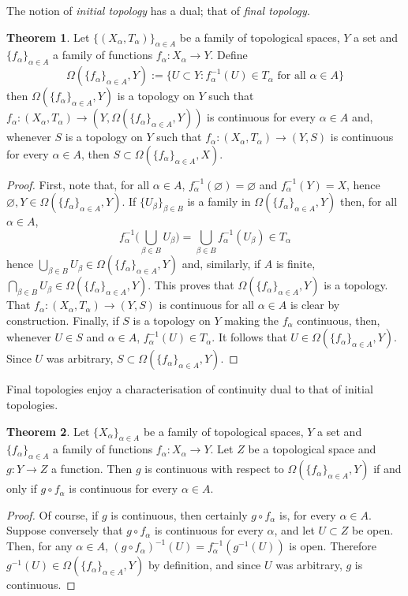 \documentclass{book}
\theoremstyle{definition}
\newtheorem{theorem}{Theorem}[section]
\theoremstyle{remark}
\newcommand{\final}[2]{\Omega(#2, #1)}
\begin{document}
The notion of \textit{initial topology} has a dual; that of \textit{final topology}.

\begin{theorem}
Let $\{(X_\alpha,T_\alpha)\}_{\alpha\in A}$ be a family of topological spaces, $Y$ a set and $\{f_\alpha\}_{\alpha\in A}$ a family of functions $f_\alpha:X_\alpha\to Y$. Define
    $$\final{Y}{\{f_\alpha\}_{\alpha\in A}}:=\{U\subset Y:f_\alpha^{-1}(U)\in T_\alpha\text{ for all }\alpha\in A\}$$
then $\final{Y}{\{f_\alpha\}_{\alpha\in A}}$ is a topology on $Y$ such that $f_\alpha:(X_\alpha, T_\alpha)\to (Y, \final{Y}{\{f_\alpha\}_{\alpha\in A}})$ is continuous for every $\alpha\in A$ and, whenever $S$ is a topology on $Y$ such that $f_\alpha:(X_\alpha, T_\alpha)\to (Y, S)$ is continuous for every $\alpha\in A$, then $S\subset\final{X}{\{f_\alpha\}_{\alpha\in A}}$.
\end{theorem}
\begin{proof}
First, note that, for all $\alpha\in A$, $f_\alpha^{-1}(\varnothing)=\varnothing$ and $f_\alpha^{-1}(Y)=X$, hence $\varnothing,Y\in \final{Y}{\{f_\alpha\}_{\alpha\in A}}$. If $\{U_\beta\}_{\beta\in B}$ is a family in $\final{Y}{\{f_\alpha\}_{\alpha\in A}}$ then, for all $\alpha\in A$,
    $$f_\alpha^{-1}\Big(\!\bigcup_{\beta\in B} U_\beta\Big)=\bigcup_{\beta\in B}f_\alpha^{-1}\left(U_\beta\right)\in T_\alpha$$
hence $\bigcup_{\beta\in B} U_\beta\in \final{Y}{\{f_\alpha\}_{\alpha\in A}}$ and, similarly, if $A$ is finite, $\bigcap_{\beta\in B} U_\beta\in \final{Y}{\{f_\alpha\}_{\alpha\in A}}$. This proves that $\final{Y}{\{f_\alpha\}_{\alpha\in A}}$ is a topology. That $f_\alpha:(X_\alpha,T_\alpha)\to(Y,S)$ is continuous for all $\alpha\in A$ is clear by construction. Finally, if $S$ is a topology on $Y$ making the $f_\alpha$ continuous, then, whenever $U\in S$ and $\alpha\in A$, $f_\alpha^{-1}(U)\in T_\alpha$. It follows that $U\in \final{Y}{\{f_\alpha\}_{\alpha\in A}}$. Since $U$ was arbitrary, $S\subset \final{Y}{\{f_\alpha\}_{\alpha\in A}}$.
\end{proof}

Final topologies enjoy a characterisation of continuity dual to that of initial topologies.

\begin{theorem}
    Let $\{X_\alpha\}_{\alpha\in A}$ be a family of topological spaces, $Y$ a set and $\{f_\alpha\}_{\alpha\in A}$ a family of functions $f_\alpha:X_\alpha\to Y$. Let $Z$ be a topological space and $g:Y\to Z$ a function. Then $g$ is continuous with respect to $\final{Y}{\{f_\alpha\}_{\alpha\in A}}$ if and only if $g\circ f_\alpha$ is continuous for every $\alpha \in A$.
\end{theorem}
\begin{proof}
    Of course, if $g$ is continuous, then certainly $g\circ f_\alpha$ is, for every $\alpha\in A$. Suppose conversely that $g\circ f_\alpha$ is continuous for every $\alpha$, and let $U\subset Z$ be open. Then, for any $\alpha\in A$, $(g\circ f_\alpha)^{-1}(U)=f_\alpha^{-1}(g^{-1}(U))$ is open. Therefore $g^{-1}(U)\in\final{Y}{\{f_\alpha\}_{\alpha\in A}}$ by definition, and since $U$ was arbitrary, $g$ is continuous.
\end{proof}
\end{document}

